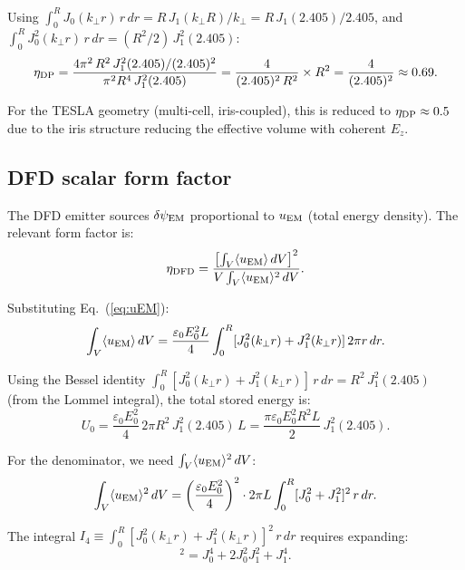 \documentclass[11pt]{article}
\newcommand{\dpsiEM}{\delta\psi_{\rm EM}}
\theoremstyle{definition}
\theoremstyle{remark}
\begin{document}
Using $\int_0^R J_0(k_\perp r)\,r\,dr = R\,J_1(k_\perp R)/k_\perp
= R\,J_1(2.405)/2.405$, and $\int_0^R J_0^2(k_\perp r)\,r\,dr
= (R^2/2)\,J_1^2(2.405)$:
\begin{equation}
\eta_{\rm DP} = \frac{4\pi^2\,R^2\,J_1^2(2.405)/(2.405)^2}
{\pi^2 R^4\,J_1^2(2.405)}
= \frac{4}{(2.405)^2\,R^2} \times R^2 = \frac{4}{(2.405)^2}
\approx 0.69.
\label{eq:eta_DP_value}
\end{equation}

For the TESLA geometry (multi-cell, iris-coupled), this is reduced
to $\eta_{\rm DP} \approx 0.5$ due to the iris structure reducing
the effective volume with coherent $E_z$.

\subsection{DFD scalar form factor}

The DFD emitter sources $\dpsiEM$ proportional to $u_{\rm EM}$
(total energy density). The relevant form factor is:
\begin{equation}
\eta_{\rm DFD} = \frac{\left[\int_V \langle u_{\rm EM}\rangle\,dV\right]^2}
{V\int_V \langle u_{\rm EM}\rangle^2\,dV}.
\label{eq:eta_DFD_def}
\end{equation}

Substituting Eq.~(\ref{eq:uEM}):
\begin{equation}
\int_V \langle u_{\rm EM}\rangle\,dV = \frac{\varepsilon_0 E_0^2 L}{4}
\int_0^R [J_0^2(k_\perp r) + J_1^2(k_\perp r)]\,2\pi r\,dr.
\label{eq:int_uEM}
\end{equation}

Using the Bessel identity $\int_0^R [J_0^2(k_\perp r) + J_1^2(k_\perp r)]
\,r\,dr = R^2\,J_1^2(2.405)$ (from the Lommel integral), the total
stored energy is:
\begin{equation}
U_0 = \frac{\varepsilon_0 E_0^2}{4}\,2\pi R^2\,J_1^2(2.405)\,L
= \frac{\pi\varepsilon_0 E_0^2 R^2 L}{2}\,J_1^2(2.405).
\end{equation}

For the denominator, we need $\int_V \langle u_{\rm EM}\rangle^2\,dV$:
\begin{equation}
\int_V \langle u_{\rm EM}\rangle^2\,dV
= \left(\frac{\varepsilon_0 E_0^2}{4}\right)^2 \cdot 2\pi L
\int_0^R [J_0^2 + J_1^2]^2\,r\,dr.
\label{eq:int_uEM2}
\end{equation}

The integral $I_4 \equiv \int_0^R [J_0^2(k_\perp r) + J_1^2(k_\perp r)]^2
\,r\,dr$ requires expanding:
\begin{equation}
[J_0^2 + J_1^2]^2 = J_0^4 + 2J_0^2 J_1^2 + J_1^4.
\label{eq:expand}
\end{equation}
\end{document}

